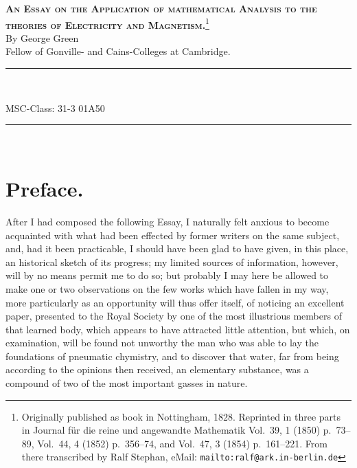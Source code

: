 \documentclass[11pt,notitlepage]{amsart}
\def\Crule{\begin{center}\rule[.5ex]{5em}{.2pt}\\[10pt]\end{center}}
\begin{document}
\thispagestyle{empty}
\begin{center}
\textsc{\huge\bf An Essay on the Application of mathematical Analysis to the 
theories of Electricity and Magnetism.}\footnote{Originally 
published as book in Nottingham, 1828. Reprinted in three parts in Journal f\"ur die reine und angewandte Mathematik
Vol.~39, 1 (1850) p.~73--89, Vol.~44, 4 (1852) p.~356--74, and Vol.~47, 3 (1854)
p.~161--221.
From there transcribed by Ralf Stephan,
eMail: \texttt{mailto:ralf@ark.in-berlin.de}}\\[5pt]
By George Green\\[5pt]
{\small Fellow of Gonville- and Cains-Colleges at Cambridge.}\\
\rule[.5ex]{10em}{.2pt}\\[10pt]
\end{center}

\bigskip

MSC-Class: 31-3 01A50
\Crule

\section{Preface.}
After I had composed the following Essay, I naturally felt anxious to
become acquainted with what had been effected by former writers on the same
subject, and, had it been practicable, I should have been glad to have given,
in this place, an historical sketch of its progress; my limited sources of information,
however, will by no means permit me to do so; but probably I may here be
allowed to make one or two observations on the few works which have fallen
in my way, more particularly as an opportunity will thus offer itself, of 
noticing an excellent paper, presented to the Royal Society by one of the most
illustrious members of that learned body, which appears to have attracted little
attention, but which, on examination, will be found not unworthy the man who
was able to lay the foundations of pneumatic chymistry, and to discover that
water, far from being according to the opinions then received, an elementary
substance, was a compound of two of the most important gasses in nature.
\end{document}
